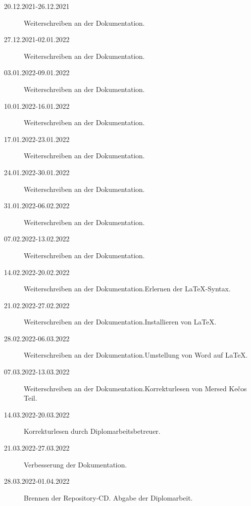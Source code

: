 \begin{description}
    \item[20.12.2021-26.12.2021] Weiterschreiben an der Dokumentation.
    \item[27.12.2021-02.01.2022] Weiterschreiben an der Dokumentation.
    \item[03.01.2022-09.01.2022] Weiterschreiben an der Dokumentation.
    \item[10.01.2022-16.01.2022] Weiterschreiben an der Dokumentation.
    \item[17.01.2022-23.01.2022] Weiterschreiben an der Dokumentation.
    \item[24.01.2022-30.01.2022] Weiterschreiben an der Dokumentation.
    \item[31.01.2022-06.02.2022] Weiterschreiben an der Dokumentation.
    \item[07.02.2022-13.02.2022] Weiterschreiben an der Dokumentation.
    \item[14.02.2022-20.02.2022] Weiterschreiben an der Dokumentation.\newline Erlernen der LaTeX-Syntax.
    \item[21.02.2022-27.02.2022] Weiterschreiben an der Dokumentation.\newline Installieren von LaTeX. 
    \item[28.02.2022-06.03.2022] Weiterschreiben an der Dokumentation.\newline Umstellung von Word auf LaTeX.
    \item[07.03.2022-13.03.2022] Weiterschreiben an der Dokumentation.\newline Korrekturlesen von Mersed Kečos Teil.
    \item[14.03.2022-20.03.2022] Korrekturlesen durch Diplomarbeitsbetreuer.
    \item[21.03.2022-27.03.2022] Verbesserung der Dokumentation.
    \item[28.03.2022-01.04.2022] Brennen der Repository-CD. Abgabe der Diplomarbeit.     
\end{description}
